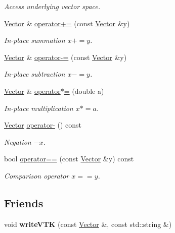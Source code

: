 \begin{DoxyCompactItemize}
\begin{DoxyCompactList}\small\item\em Access underlying vector space. \end{DoxyCompactList}\item 
\hyperlink{classSpacy_1_1FEniCS_1_1Vector}{Vector} \& \hyperlink{classSpacy_1_1AddArithmeticOperators_afad1d01e1e8c6f75290ac46d9b047ea8}{operator+=} (const \hyperlink{classSpacy_1_1FEniCS_1_1Vector}{Vector} \&y)
\begin{DoxyCompactList}\small\item\em In-\/place summation $ x+=y$. \end{DoxyCompactList}\item 
\hyperlink{classSpacy_1_1FEniCS_1_1Vector}{Vector} \& \hyperlink{classSpacy_1_1AddArithmeticOperators_a9fa91e177d13203cfe8cfa991c64ca36}{operator-\/=} (const \hyperlink{classSpacy_1_1FEniCS_1_1Vector}{Vector} \&y)
\begin{DoxyCompactList}\small\item\em In-\/place subtraction $ x-=y$. \end{DoxyCompactList}\item 
\hyperlink{classSpacy_1_1FEniCS_1_1Vector}{Vector} \& \hyperlink{classSpacy_1_1AddArithmeticOperators_a1d3db95b24fd2bc1de712c9e04c47e2f}{operator$\ast$=} (double a)
\begin{DoxyCompactList}\small\item\em In-\/place multiplication $ x*=a$. \end{DoxyCompactList}\item 
\hyperlink{classSpacy_1_1FEniCS_1_1Vector}{Vector} \hyperlink{classSpacy_1_1AddArithmeticOperators_a5acd030bf265d130983fd6e3c5b68be5}{operator-\/} () const
\begin{DoxyCompactList}\small\item\em Negation $ -x$. \end{DoxyCompactList}\item 
bool \hyperlink{classSpacy_1_1AddArithmeticOperators_a5ff1909f49f4a705d69663dc2d4b6316}{operator==} (const \hyperlink{classSpacy_1_1FEniCS_1_1Vector}{Vector} \&y) const
\begin{DoxyCompactList}\small\item\em Comparison operator $ x==y$. \end{DoxyCompactList}\end{DoxyCompactItemize}
\subsection*{Friends}
\begin{DoxyCompactItemize}
\item 
\hypertarget{classSpacy_1_1FEniCS_1_1Vector_a2629dbd03686bf8d84249acc5984260a}{void {\bfseries write\-V\-T\-K} (const \hyperlink{classSpacy_1_1FEniCS_1_1Vector}{Vector} \&, const std\-::string \&)}\label{classSpacy_1_1FEniCS_1_1Vector_a2629dbd03686bf8d84249acc5984260a}

\end{DoxyCompactItemize}


